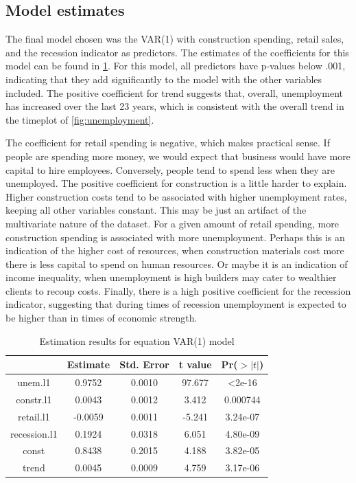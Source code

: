 \documentclass[twoside,twocolumn]{article}
\begin{document}
 \subsection{Model estimates} \label{estimates}

The final model chosen was the VAR(1) with construction spending, retail sales, and the recession indicator as predictors.
 The estimates of the coefficients for this model can be found in \ref{tab:estimates}. For this model, all predictors have p-values below .001, indicating that they add significantly to the model with the other variables included. The positive coefficient for trend suggests that, overall, unemployment has increased over the last 23 years, which is consistent with the overall trend in the timeplot of \ref{fig:unemployment}.


The coefficient for retail spending is negative, which makes practical sense. If people are spending more money, we would expect that business would have more capital to hire employees. Conversely, people tend to spend less when they are unemployed.  The positive coefficient for construction is a little harder to explain. Higher construction costs tend to be associated with higher unemployment rates, keeping all other variables constant.  This may be just an artifact of the multivariate nature of the dataset. For a given amount of retail spending, more construction spending is associated with more unemployment. Perhaps this is an indication of the higher cost of resources, when construction materials cost more there is less capital to spend on human resources. Or maybe it is an indication of income inequality, when unemployment is high builders may cater to wealthier clients to recoup costs. Finally, there is a high positive coefficient for the recession indicator, suggesting that during times of recession unemployment is expected to be higher than in times of economic strength.


{\small
\begin{table}[htb]
\centering
\caption{Estimation results for equation VAR(1) model}
\label{tab:estimates}
\begin{tabular}{@{}ccccc@{}}
\toprule
& Estimate & Std. Error & t value & Pr(\(>|t|\))     \\ \midrule
unem.l1      & 0.9752  & 0.0010 & 97.677 & \textless  2e-16 \\
constr.l1    & 0.0043 & 0.0012 & 3.412  & 0.000744 \\
retail.l1    & -0.0059 & 0.0011 & -5.241 & 3.24e-07 \\
recession.l1 & 0.1924  & 0.0318 & 6.051  & 4.80e-09 \\
const        & 0.8438  & 0.2015 & 4.188  & 3.82e-05 \\
trend        & 0.0045  & 0.0009 & 4.759  & 3.17e-06 \\ \bottomrule
\end{tabular}
\end{table}}
\end{document}
